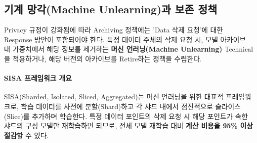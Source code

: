 \subsection{기계 망각(Machine Unlearning)과 보존 정책}
\label{sec:12.3.2}

Privacy 규정이 강화됨에 따라 Archiving 정책에는 'Data 삭제 요청'에 대한 Response 방안이 포함되어야 한다. 특정 데이터 주체의 삭제 요청 시, 모델 아카이브 내 가중치에서 해당 정보를 제거하는 \textbf{머신 언러닝(Machine Unlearning)} \cite{cao2015towards} Technical을 적용하거나, 해당 버전의 아카이브를 Retire하는 정책을 수립한다.

\paragraph{SISA 프레임워크 개요}
SISA(Sharded, Isolated, Sliced, Aggregated)\cite{bourtoule2021unlearning}는 머신 언러닝을 위한 대표적 프레임워크로, 학습 데이터를 사전에 분할(Shard)하고 각 샤드 내에서 점진적으로 슬라이스(Slice)를 추가하며 학습한다. 특정 데이터 포인트의 삭제 요청 시 해당 포인트가 속한 샤드의 구성 모델만 재학습하면 되므로, 전체 모델 재학습 대비 \textbf{계산 비용을 95\% 이상 절감}할 수 있다.

